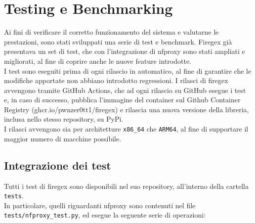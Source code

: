 \chapter{Testing e Benchmarking}

Ai fini di verificare il corretto funzionamento del sistema e valutarne le prestazioni, sono stati sviluppati una serie di test e benchmark. Firegex già presentava un set di test, che con l'integrazione di nfproxy sono stati ampliati e migliorati, al fine di coprire anche le nuove
feature introdotte.\\
I test sono eseguiti prima di ogni rilascio in automatico, al fine di garantire che le modifiche apportate non abbiano introdotto regressioni. I rilasci di firegex avvengono tramite GitHub Actions, che ad ogni rilascio su GitHub esegue i test e, in caso di successo, pubblica l'immagine del container sul Github Container Registry (ghcr.io/pwnzer0tt1/firegex) e rilascia una nuova versione della libreria, inclusa nello stesso repository, su PyPi.\\
I rilasci avvengono sia per architetture \texttt{x86\_64} che \texttt{ARM64}, al fine di supportare il maggior numero di macchine possibile.\\

\section{Integrazione dei test}

Tutti i test di firegex sono disponibili nel suo repository, all'interno della cartella \texttt{tests}.\\
In particolare, quelli riguardanti nfproxy sono contenuti nel file \texttt{tests/nfproxy\_test.py}, ed esegue la seguente serie di operazioni:

